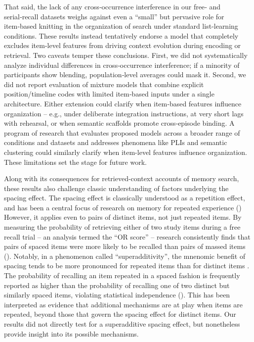 \documentclass[
  man,
  floatsintext,
  longtable,
  nolmodern,
  notxfonts,
  notimes,
  draftfirst,
  colorlinks=true,linkcolor=blue,citecolor=blue,urlcolor=blue]{apa7}
\begin{document}
That said, the lack of any cross‑occurrence interference in our free‑
and serial‑recall datasets weighs against even a ``small'' but pervasive
role for item‑based knitting in the organization of search under
standard list‑learning conditions. These results instead tentatively
endorse a model that completely excludes item-level features from
driving context evolution during encoding or retrieval. Two caveats
temper these conclusions. First, we did not systematically analyze
individual differences in cross‑occurrence interference; if a minority
of participants show blending, population‑level averages could mask it.
Second, we did not report evaluation of mixture models that combine
explicit position/timeline codes with limited item‑based inputs under a
single architecture. Either extension could clarify when item‑based
features influence organization -- e.g., under deliberate integration
instructions, at very short lags with rehearsal, or when semantic
scaffolds promote cross‑episode binding. A program of research that
evaluates proposed models across a broader range of conditions and
datasets and addresses phenomena like PLIs and semantic clustering could
similarly clarify when item-level features influence organization. These
limitations set the stage for future work.

Along with its consequences for retrieved-context accounts of memory
search, these results also challenge classic understanding of factors
underlying the spacing effect. The spacing effect is classically
understood as a repetition effect, and has been a central focus of
research on memory for repeated experience
() However, it
applies even to pairs of distinct items, not just repeated items. By
measuring the probability of retrieving either of two study items during
a free recall trial -- an analysis termed the ``OR score'' -- research
consistently finds that pairs of spaced items were more likely to be
recalled than pairs of massed items
(). Notably, in
a phenomenon called ``superadditivity'', the mnenomic benefit of spacing
tends to be more pronounced for repeated items than for distinct items .
The probability of recalling an item repeated in a spaced fashion is
frequently reported as higher than the probability of recalling one of
two distinct but similarly spaced items, violating statistical
independence (). This has been interpreted as evidence that additional mechanisms
are at play when items are repeated, beyond those that govern the
spacing effect for distinct items. Our results did not directly test for
a superadditive spacing effect, but nonetheless provide insight into its
possible mechanisms.
\end{document}
